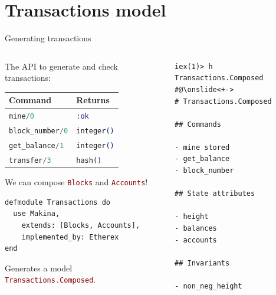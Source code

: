 \documentclass[aspectratio=169, 10pt, handout]{beamer}
\begin{document}
\section{Transactions model}
\label{sec:orgd125b6f}
\begin{frame}[label={sec:orge291fc0},fragile]{Generating transactions}
 \begin{columns}
\begin{column}{0.48\columnwidth}
\onslide<+->
\onslide<+->
The API to generate and check transactions:
\onslide<+->
\begin{center}
\begin{tabular}{ll}
Command & Returns\\
\hline
\lstinline[language=elixir, style=display]~mine/0~ & \lstinline[language=elixir, style=display]~:ok~\\
\lstinline[language=elixir, style=display]~block_number/0~ & \lstinline[language=elixir, style=display]~integer()~\\
\lstinline[language=elixir, style=display]~get_balance/1~ & \lstinline[language=elixir, style=display]~integer()~\\
\lstinline[language=elixir, style=display]~transfer/3~ & \lstinline[language=elixir, style=display]~hash()~\\
\end{tabular}
\end{center}
\onslide<+->
We can compose \lstinline[language=elixir, style=display]~Blocks~ and \lstinline[language=elixir, style=display]~Accounts~!
\onslide<+->
\lstset{language=elixir,label= ,caption= ,captionpos=b,numbers=none,style=display}
\begin{lstlisting}
defmodule Transactions do
  use Makina,
    extends: [Blocks, Accounts],
    implemented_by: Etherex
end
\end{lstlisting}
\onslide<+->
Generates a model \lstinline[language=elixir, style=display]~Transactions.Composed~.
\end{column}

\begin{column}{0.48\columnwidth}
\onslide<+->
\lstset{language=bash,label= ,caption= ,captionpos=b,numbers=none,style=shell}
\begin{lstlisting}
iex(1)> h Transactions.Composed
#@\onslide<+->
# Transactions.Composed

## Commands

- mine stored
- get_balance
- block_number

## State attributes

- height
- balances
- accounts

## Invariants

- non_neg_height

\end{lstlisting}
\end{column}
\end{columns}
\end{frame}
\end{document}
